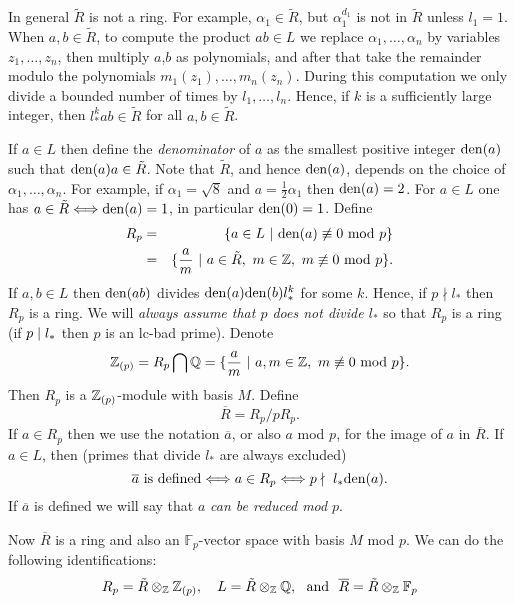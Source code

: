 \documentclass[10pt]{article}
\newcommand{\notdivides}{\nmid}
\newcommand{\Q}{\QQ}
\newcommand{\Z}{\ZZ}
\newcommand{\Fp}{{\mathbb F}_p}
\newcommand{\degr}{d}
\newcommand{\minp}{m}
\newcommand{\bad}{lc-bad }
\begin{document}
In general $\tilde{R}$ is not a ring.
For example, $\alpha_1 \in \tilde{R}$, but $\alpha_1^{\degr_1}$ is not
in $\tilde{R}$ unless $l_1=1$.
When $a,b \in \tilde{R}$, to compute the product $ab \in L$ we
replace $\alpha_1,\ldots,\alpha_n$ by variables $z_1,\ldots,z_n$,
then multiply $a$,$b$
as polynomials, and after that
take the remainder modulo the polynomials $\minp_1(z_1),\ldots,\minp_n(z_n)$.
During this computation we only divide a bounded number of times by 
$l_1,\ldots,l_n$. Hence, if $k$ is a sufficiently large integer, then
$l_*^k ab \in \tilde{R}$ for all $a,b \in \tilde{R}$.


If $a \in L$ then define the {\em denominator} of $a$ as the smallest
positive integer ${\rm den}(a)$ such that ${\rm den}(a) a \in \tilde{R}$.
Note that $\tilde{R}$, and hence ${\rm den}(a)$, depends on the choice of
$\alpha_1,\ldots,\alpha_n$.
For example, if $\alpha_1 = \sqrt{8}$
and $a = \frac12 \alpha_1$ then ${\rm den}(a)=2$.
For $a \in L$ one has $a \in \tilde{R} \Longleftrightarrow {\rm den}(a)=1$,
in particular ${\rm den}(0)=1$.
Define
\begin{eqnarray}
	R_p & = &
	\{ a \in L\ \vert \ {\rm den}(a) \not\equiv 0 {\rm \ mod \ } p \} \\
	& = & \{ \frac{a}m\ \vert \ a \in \tilde{R},\ m \in \Z,\ m \not\equiv 0 {\rm \ mod \ }
p\}.
	\label{Rp}
\end{eqnarray}
If $a,b \in L$ then ${\rm den}(ab)$ divides ${\rm den}(a){\rm den}(b) l_*^k$
for some $k$. Hence, if $p \notdivides l_*$ then $R_p$ is a ring.
We will {\em always assume that $p$ does not divide $l_*$} so that $R_p$ is a ring
(if $p \mid l_*$ then $p$ is an \bad prime).
Denote
\[
	\Z_{(p)} = R_p \bigcap \Q = \{ \frac{a}{m}\ \vert\ a,m \in \Z, \ m
	\not\equiv 0 {\rm \ mod \ } p \}.
\]
Then $R_p$ is a $\Z_{(p)}$-module with basis $M$.
Define \[ \overline{R} = R_p/pR_p. \]
If $a \in R_p$ then we use the notation $\overline{a}$, or also $a$ mod $p$,
for the image of $a$ in $\overline{R}$. If $a \in L$, then
(primes that divide $l_*$ are always excluded)
\[
	\overline{a} {\rm \ is \ defined }
\Longleftrightarrow
	a \in R_p
\Longleftrightarrow
	p \notdivides \ l_* {\rm den}(a).
\]
If $\overline{a}$ is defined we will say that $a$ {\em can be reduced mod} $p$.


Now $\overline{R}$ is a ring and also an $\Fp$-vector space with
basis $M$ mod $p$. We can do the following identifications:
\begin{equation}
\label{tensorprods}
	    R_p = \tilde{R} \otimes_{\Z} \Z_{(p)}, \ \ \
	      L = \tilde{R} \otimes_{\Z} \Q, {\rm \ \ and \ \ }
  \overline{R}  = \tilde{R} \otimes_{\Z} \Fp
\end{equation}
\end{document}
